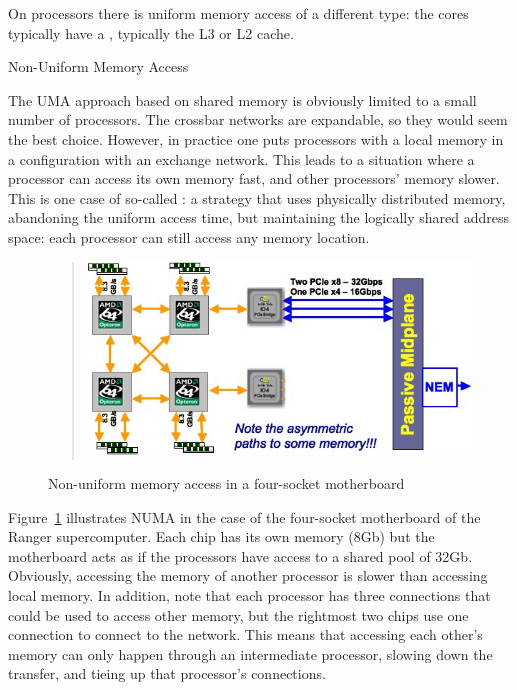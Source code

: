 On  processors there is uniform memory access of
a different type: the cores typically have a
, typically the L3 or L2 cache.

 {Non-Uniform Memory Access}
\label{sec:numa}

The \ac{UMA} approach based on shared memory 
is obviously limited to a small number of
processors. The crossbar networks are expandable, so they would seem 
the best choice. 
However, in practice one puts 
processors with a local memory in a configuration with an exchange
network. This leads to a situation where a processor can access its
own memory fast, and other processors' memory slower.
This is one case of so-called : a strategy that
uses physically distributed memory, abandoning the uniform access
time, but maintaining the logically shared address space: each processor can
still access any memory location.

\begin{figure}
  \begin{quote}
  \includegraphics[scale=.6]{graphics/ranger-numa}
  \end{quote}
  \caption{Non-uniform memory access in a four-socket motherboard}
  \label{fig:ranger-numa}
\end{figure}

Figure~\ref{fig:ranger-numa} illustrates \ac{NUMA} in the case of the
four-socket motherboard of the Ranger supercomputer. Each chip has its
own memory (8Gb) but the motherboard acts as if the processors have
access to a shared pool of 32Gb. Obviously, accessing the memory of
another processor is slower than accessing local memory. In addition,
note that each processor has three connections that could be used to
access other memory, but the rightmost two chips use one connection to
connect to the network. This means that accessing each other's memory
can only happen through an intermediate processor, slowing down the
transfer, and tieing up that processor's connections.

